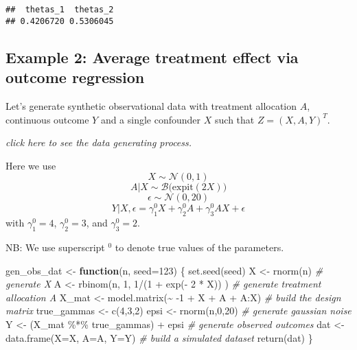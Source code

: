 \documentclass[
]{article}
\newenvironment{Shaded}{\begin{snugshade}}{\end{snugshade}}
\newcommand{\AttributeTok}[1]{\textcolor[rgb]{0.77,0.63,0.00}{#1}}
\newcommand{\CommentTok}[1]{\textcolor[rgb]{0.56,0.35,0.01}{\textit{#1}}}
\newcommand{\ControlFlowTok}[1]{\textcolor[rgb]{0.13,0.29,0.53}{\textbf{#1}}}
\newcommand{\DecValTok}[1]{\textcolor[rgb]{0.00,0.00,0.81}{#1}}
\newcommand{\FunctionTok}[1]{\textcolor[rgb]{0.00,0.00,0.00}{#1}}
\newcommand{\NormalTok}[1]{#1}
\newcommand{\OtherTok}[1]{\textcolor[rgb]{0.56,0.35,0.01}{#1}}
\newcommand{\SpecialCharTok}[1]{\textcolor[rgb]{0.00,0.00,0.00}{#1}}
\begin{document}
\begin{verbatim}
##  thetas_1  thetas_2 
## 0.4206720 0.5306045
\end{verbatim}

\hypertarget{example-2-average-treatment-effect-via-outcome-regression}{%
\subsection{Example 2: Average treatment effect via outcome
regression}\label{example-2-average-treatment-effect-via-outcome-regression}}

Let's generate synthetic observational data with treatment allocation
\(A\), continuous outcome \(Y\) and a single confounder \(X\) such that
\(Z=(X,A,Y)^T\).

\emph{click here to see the data generating process.}

Here we use \[X \sim \mathcal{N}(0,1)\]
\[A|X \sim \mathcal{B}\Big(\text{expit}(2X)\Big)\]
\[\epsilon \sim \mathcal{N}(0,20)\]
\[Y|X,\epsilon = \gamma_1^{0} X + \gamma_2^{0} A + \gamma_3^{0} AX + \epsilon\]
with \(\gamma_1^{0}=4\), \(\gamma_2^{0}=3\), and \(\gamma_3^{0}=2\).

NB: We use superscript \(^{0}\) to denote true values of the parameters.

\begin{Shaded}
\begin{Highlighting}[]
\NormalTok{gen\_obs\_dat }\OtherTok{\textless{}{-}} \ControlFlowTok{function}\NormalTok{(n, }\AttributeTok{seed=}\DecValTok{123}\NormalTok{)}
\NormalTok{\{}
\FunctionTok{set.seed}\NormalTok{(seed)}
\NormalTok{X }\OtherTok{\textless{}{-}} \FunctionTok{rnorm}\NormalTok{(n) }\CommentTok{\# generate X}
\NormalTok{A }\OtherTok{\textless{}{-}} \FunctionTok{rbinom}\NormalTok{(n, }\DecValTok{1}\NormalTok{, }\DecValTok{1}\SpecialCharTok{/}\NormalTok{(}\DecValTok{1} \SpecialCharTok{+} \FunctionTok{exp}\NormalTok{(}\SpecialCharTok{{-}} \DecValTok{2} \SpecialCharTok{*}\NormalTok{ X)) )  }\CommentTok{\# generate treatment allocation A}
\NormalTok{X\_mat }\OtherTok{\textless{}{-}} \FunctionTok{model.matrix}\NormalTok{(}\SpecialCharTok{\textasciitilde{}} \SpecialCharTok{{-}}\DecValTok{1} \SpecialCharTok{+}\NormalTok{ X }\SpecialCharTok{+}\NormalTok{ A }\SpecialCharTok{+}\NormalTok{ A}\SpecialCharTok{:}\NormalTok{X) }\CommentTok{\# build the design matrix}
\NormalTok{true\_gammas }\OtherTok{\textless{}{-}} \FunctionTok{c}\NormalTok{(}\DecValTok{4}\NormalTok{,}\DecValTok{3}\NormalTok{,}\DecValTok{2}\NormalTok{) }
\NormalTok{epsi }\OtherTok{\textless{}{-}} \FunctionTok{rnorm}\NormalTok{(n,}\DecValTok{0}\NormalTok{,}\DecValTok{20}\NormalTok{) }\CommentTok{\# generate gaussian noise }
\NormalTok{Y }\OtherTok{\textless{}{-}}\NormalTok{ (X\_mat }\SpecialCharTok{\%*\%}\NormalTok{ true\_gammas) }\SpecialCharTok{+}\NormalTok{ epsi }\CommentTok{\# generate observed outcomes }
\NormalTok{dat  }\OtherTok{\textless{}{-}}  \FunctionTok{data.frame}\NormalTok{(}\AttributeTok{X=}\NormalTok{X, }\AttributeTok{A=}\NormalTok{A, }\AttributeTok{Y=}\NormalTok{Y) }\CommentTok{\# build a simulated dataset}
\FunctionTok{return}\NormalTok{(dat)}
\NormalTok{\}}
\end{Highlighting}
\end{Shaded}
\end{document}
